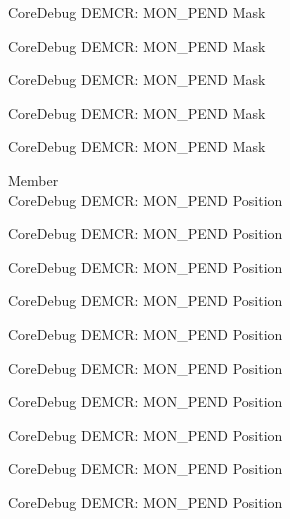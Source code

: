 \begin{DoxyRefList}
\label{deprecated__deprecated000855}%
%
Core\+Debug DEMCR\+: MON\+\_\+\+PEND Mask 

\label{deprecated__deprecated000997}%
%
Core\+Debug DEMCR\+: MON\+\_\+\+PEND Mask 

\label{deprecated__deprecated001073}%
%
Core\+Debug DEMCR\+: MON\+\_\+\+PEND Mask 

\label{deprecated__deprecated001162}%
%
Core\+Debug DEMCR\+: MON\+\_\+\+PEND Mask 

\label{deprecated__deprecated001264}%
%
Core\+Debug DEMCR\+: MON\+\_\+\+PEND Mask  
\item[Member \doxylink{group___c_m_s_i_s___core_debug_ga1e2f706a59e0d8131279af1c7e152f8d}{Core\+Debug\+\_\+\+DEMCR\+\_\+\+MON\+\_\+\+PEND\+\_\+\+Pos} ]\hfill \\
\label{deprecated__deprecated000051}%
%
Core\+Debug DEMCR\+: MON\+\_\+\+PEND Position 

\label{deprecated__deprecated000195}%
%
Core\+Debug DEMCR\+: MON\+\_\+\+PEND Position 

\label{deprecated__deprecated000337}%
%
Core\+Debug DEMCR\+: MON\+\_\+\+PEND Position 

\label{deprecated__deprecated000413}%
%
Core\+Debug DEMCR\+: MON\+\_\+\+PEND Position 

\label{deprecated__deprecated000502}%
%
Core\+Debug DEMCR\+: MON\+\_\+\+PEND Position 

\label{deprecated__deprecated000604}%
%
Core\+Debug DEMCR\+: MON\+\_\+\+PEND Position 

\label{deprecated__deprecated000710}%
%
Core\+Debug DEMCR\+: MON\+\_\+\+PEND Position 

\label{deprecated__deprecated000854}%
%
Core\+Debug DEMCR\+: MON\+\_\+\+PEND Position 

\label{deprecated__deprecated000996}%
%
Core\+Debug DEMCR\+: MON\+\_\+\+PEND Position 

\label{deprecated__deprecated001072}%
%
Core\+Debug DEMCR\+: MON\+\_\+\+PEND Position 


\end{DoxyRefList}
